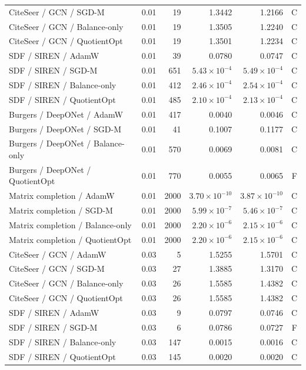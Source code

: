 \begin{longtable}{p{.34\linewidth}p{.09\linewidth}rrrr}
CiteSeer / GCN / SGD-M & 0.01 & 19 & 1.3442 & 1.2166 & C\\
CiteSeer / GCN / Balance-only & 0.01 & 19 & 1.3505 & 1.2240 & C\\
\rowcolor{oursbg}CiteSeer / GCN / QuotientOpt & 0.01 & 19 & 1.3501 & 1.2234 & C\\
SDF / SIREN / AdamW & 0.01 & 39 & 0.0780 & 0.0747 & C\\
SDF / SIREN / SGD-M & 0.01 & 651 & $5.43\!\times\!10^{-4}$ & $5.49\!\times\!10^{-4}$ & C\\
SDF / SIREN / Balance-only & 0.01 & 412 & $2.46\!\times\!10^{-4}$ & $2.54\!\times\!10^{-4}$ & C\\
\rowcolor{oursbg}SDF / SIREN / QuotientOpt & 0.01 & 485 & $2.10\!\times\!10^{-4}$ & $2.13\!\times\!10^{-4}$ & C\\
Burgers / DeepONet / AdamW & 0.01 & 417 & 0.0040 & 0.0046 & C\\
Burgers / DeepONet / SGD-M & 0.01 & 41 & 0.1007 & 0.1177 & C\\
Burgers / DeepONet / Balance-only & 0.01 & 570 & 0.0069 & 0.0081 & C\\
\rowcolor{oursbg}Burgers / DeepONet / QuotientOpt & 0.01 & 770 & 0.0055 & 0.0065 & F\\
Matrix completion / AdamW & 0.01 & 2000 & $3.70\!\times\!10^{-10}$ & $3.87\!\times\!10^{-10}$ & C\\
Matrix completion / SGD-M & 0.01 & 2000 & $5.99\!\times\!10^{-7}$ & $5.46\!\times\!10^{-7}$ & C\\
Matrix completion / Balance-only & 0.01 & 2000 & $2.20\!\times\!10^{-6}$ & $2.15\!\times\!10^{-6}$ & C\\
\rowcolor{oursbg}Matrix completion / QuotientOpt & 0.01 & 2000 & $2.20\!\times\!10^{-6}$ & $2.15\!\times\!10^{-6}$ & C\\
CiteSeer / GCN / AdamW & 0.03 & 5 & 1.5255 & 1.5701 & C\\
CiteSeer / GCN / SGD-M & 0.03 & 27 & 1.3885 & 1.3170 & C\\
CiteSeer / GCN / Balance-only & 0.03 & 26 & 1.5585 & 1.4382 & C\\
\rowcolor{oursbg}CiteSeer / GCN / QuotientOpt & 0.03 & 26 & 1.5585 & 1.4382 & C\\
SDF / SIREN / AdamW & 0.03 & 9 & 0.0797 & 0.0746 & C\\
SDF / SIREN / SGD-M & 0.03 & 6 & 0.0786 & 0.0727 & F\\
SDF / SIREN / Balance-only & 0.03 & 147 & 0.0015 & 0.0016 & C\\
\rowcolor{oursbg}SDF / SIREN / QuotientOpt & 0.03 & 145 & 0.0020 & 0.0020 & C\\

\end{longtable}
